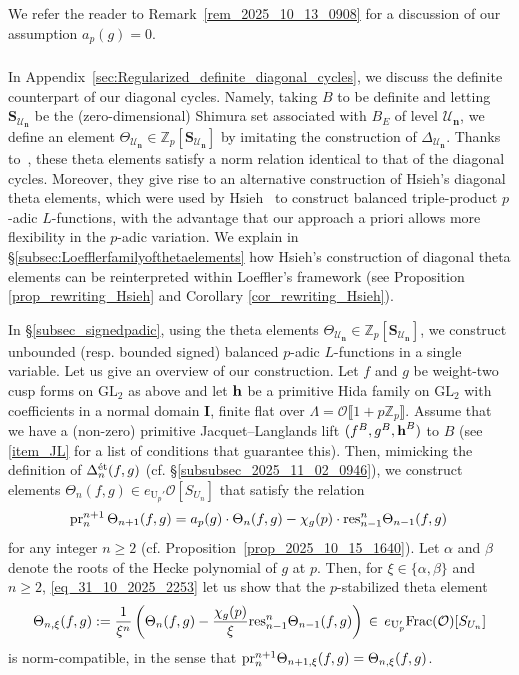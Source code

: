 \documentclass{amsart}
\numberwithin{equation}{section}
\newcommand{\Zp}{\mathbb{Z}_p}
\newcommand{\cO}{\mathcal{O}}
\newcommand{\GL}{\mathrm{GL}}
\newcommand{\h}{\textup{\bf h}}
\newcommand{\res}{\textup{res}}
\newcommand{\etale}{\textup{\'et}}
\newcommand{\BI}{\mathbf{I}}
\begin{document}
We refer the reader to Remark~\ref{rem_2025_10_13_0908} for a discussion of our assumption $a_p(g)=0$. 

\subsubsection{} 
\label{subsubsec_2025_10_31_1451}
In Appendix~\ref{sec:Regularized_definite_diagonal_cycles}, we discuss the definite counterpart of our diagonal cycles. Namely, taking $B$ to be definite and letting $\mathbf{S}_{\mathcal{U}_{\mathbf{n}}}$ be the (zero-dimensional) Shimura set associated with $B_E$ of level $\mathcal{U}_{\mathbf{n}}$, we define an element $\Theta_{\mathcal{U}_{\mathbf{n}}}\in  \Zp[\mathbf{S}_{\mathcal{U}_{\mathbf{n}}}]$ by imitating the construction of $\Delta_{\mathcal{U}_{\mathbf{n}}}$. Thanks to~\cite{LoefflerSpherical}, these theta elements satisfy a norm relation identical to that of the diagonal cycles. Moreover, they give rise to an alternative construction of Hsieh's diagonal theta elements, which were used by Hsieh~\cite{hsiehpadicbalanced} to construct balanced triple-product $p$-adic $L$-functions, with the advantage that our approach a priori allows more flexibility in the $p$-adic variation. We explain in \S\ref{subsec:Loefflerfamilyofthetaelements} how Hsieh's construction of diagonal theta elements can be reinterpreted within Loeffler's framework (see Proposition \ref{prop_rewriting_Hsieh} and Corollary \ref{cor_rewriting_Hsieh}). 



In \S\ref{subsec_signedpadic}, using the theta elements $\Theta_{\mathcal{U}_{\mathbf{n}}}\in  \Zp[\mathbf{S}_{\mathcal{U}_{\mathbf{n}}}]$, we
construct unbounded (resp. bounded signed) balanced $p$-adic $L$-functions in a single variable. Let us give an overview of our construction. Let $f$ and $g$ be weight-two cusp forms on $\GL_2$ as above and let $\h$ be a primitive Hida family on $\GL_2$  with coefficients in a normal domain $\BI$, finite flat over $\Lambda = \cO\llbracket1+p\Zp\rrbracket$. Assume that we have a (non-zero) primitive Jacquet--Langlands lift $(f^B,g^B,\h^B)$ to $B$ (see \eqref{item_JL} for a list of conditions that guarantee this). Then, mimicking the definition of ${\Delta}_{n}^{\etale}(f,g)$ (cf. \S\ref{subsubsec_2025_11_02_0946}), we construct elements $\Theta_{n}(f,g) \in e_{\mathrm{U}_{p}'}\mathcal{O}[S_{U_{n}}]$ that satisfy the relation
    \begin{align}\label{eq_31_10_2025_2253}
        {\rm pr}_{n}^{n+1}\,\Theta_{n+1}(f,g)=a_p(g)\cdot\Theta_{n}(f,g)-\chi_g(p)\cdot \res_{n-1}^{n}\Theta_{n-1}(f,g)\,
    \end{align}
 for any integer $n \geq 2$ (cf. Proposition~\ref{prop_2025_10_15_1640}).   
Let $\alpha$ and $\beta$ denote the roots of the Hecke polynomial of $g$ at $p$. Then,  for $\xi \in \{ \alpha, \beta\}$ and $n \geq 2$, \eqref{eq_31_10_2025_2253} let us show that the $p$-stabilized theta element $$\Theta_{n,\xi}(f,g):=\frac{1}{\xi^{n}}\left(\Theta_{n}(f,g)-\frac{\chi_g(p)}{\xi}\res_{n-1}^{n} \Theta_{n-1}(f,g)\right) \,\in\, e_{\mathrm{U}_{p}'}{\rm Frac}(\mathcal{O})[S_{U_n}]$$
is norm-compatible, in the sense that ${\rm pr}_{n}^{n+1} \Theta_{n+1,\xi}(f,g) = \Theta_{n,\xi}(f,g)$. 
\end{document}
